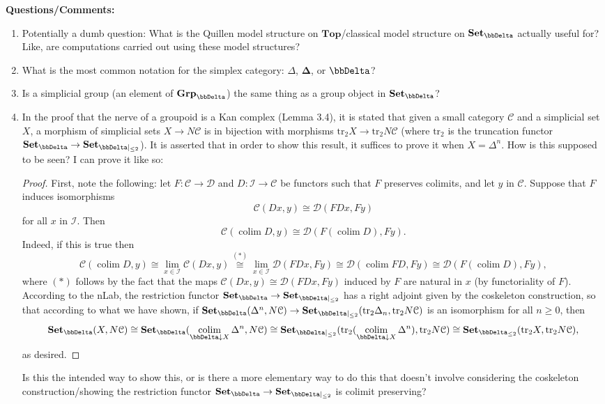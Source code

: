 \documentclass{amsart}
\newcommand{\bDelta}{\mathbf{\Delta}}
\theoremstyle{plain}
\theoremstyle{definition}
\newcommand{\Top}{\mbf{Top}}
\newcommand{\Set}{\mbf{Set}}
\newcommand{\Grp}{\mbf{Grp}}
\newcommand{\0}{\mathbf{0}}
\newcommand{\cC}{\mathcal C}
\newcommand{\cD}{\mathcal D}
\newcommand{\cI}{\mathcal I}
\newcommand{\mbf}[1]{\mathbf{#1}}
\renewcommand{\(}{\left(}
\renewcommand{\)}{\right)}
\DeclareMathOperator*{\colim}{colim}
\begin{document}
\textbf{Questions/Comments:}\begin{enumerate}[listparindent=\parindent,parsep=5pt]
  \item Potentially a dumb question: What is the Quillen model structure on $\Top$/classical model structure on $\Set_\bbDelta$ actually useful for? Like, are computations carried out using these model structures?
  \item What is the most common notation for the simplex category: $\Delta$, $\bDelta$, or $\bbDelta$?
  \item Is a simplicial group (an element of $\Grp_\bbDelta$) the same thing as a group object in $\Set_\bbDelta$?
  \item In the proof that the nerve of a groupoid is a Kan complex (Lemma 3.4), it is stated that given a small category $\cC$ and a simplicial set $X$, a morphism of simplicial sets $X\to N\cC$ is in bijection with morphisms $\mathrm{tr}_2X\to\mathrm{tr}_2N\cC$ (where $\mathrm{tr}_2$ is the truncation functor $\Set_\bbDelta\to\Set_{\bbDelta|_{\leq 2}}$). It is asserted that in order to show this result, it suffices to prove it when $X=\Delta^n$. How is this supposed to be seen? I can prove it like so:
  \begin{proof}
	First, note the following: let $F:\cC\to\cD$ and $D:\cI\to\cC$ be functors such that $F$ preserves colimits, and let $y$ in $\cC$. Suppose that $F$ induces isomorphisms
	\[\cC(Dx,y)\cong\cD(FDx,Fy)\]
	for all $x$ in $\cI$. Then
	\[\cC(\colim D,y)\cong\cD(F(\colim D),Fy).\]
	Indeed, if this is true then
	\[\cC(\colim D,y)\cong\lim_{x\in\cI}\cC(Dx,y)\overset{(\ast)}\cong\lim_{x\in\cI}\cD(FDx,Fy)\cong\cD(\colim FD,Fy)\cong\cD(F(\colim D),Fy),\]
	where $(\ast)$ follows by the fact that the maps $\cC(Dx,y)\cong\cD(FDx,Fy)$ induced by $F$ are natural in $x$ (by functoriality of $F$). According to the nLab, the restriction functor $\Set_{\bbDelta}\to\Set_{\bbDelta|_{\leq2}}$ has a right adjoint given by the coskeleton construction, so that according to what we have shown, if $\Set_\bbDelta(\Delta^n,N\cC)\to\Set_{\bbDelta|_{\leq2}}(\mathrm{tr}_2\Delta_n,\mathrm{tr}_2N\cC)$ is an isomorphism for all $n\geq0$, then
	\[\Set_\bbDelta(X,N\cC)\cong\Set_\bbDelta(\colim_{\bbDelta\downarrow X}\Delta^n,N\cC)\cong\Set_{\bbDelta|_{\leq2}}(\mathrm{tr}_2(\colim_{\bbDelta\downarrow X}\Delta^n),\mathrm{tr}_2N\cC)\cong\Set_{\bbDelta_{\leq2}}(\mathrm{tr}_2X,\mathrm{tr}_2N\cC),\]
	as desired.
  \end{proof}
  Is this the intended way to show this, or is there a more elementary way to do this that doesn't involve considering the coskeleton construction/showing the restriction functor $\Set_\bbDelta\to\Set_{\bbDelta|_{\leq2}}$ is colimit preserving?

\end{enumerate}
\end{document}
